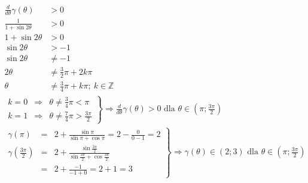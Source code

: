         \begin{align*}
        	\frac{d}{d\theta}\gamma\left( \theta\right)& > 0& \hspace{10cm}\\
        	\frac{
        		1
        	}{
        		1 + \sin 2\theta
        	} & > 0\\
        	1 + \sin 2\theta & > 0\\
        	 \sin 2\theta & > -1\\
        	 \sin 2\theta & \neq -1\\
        	 2\theta & \neq \frac{3}{2}\pi + 2k\pi\\
        	 \theta & \neq \frac{3}{4}\pi + k\pi ; \ k \in \mathbb{Z}
        \end{align*}
       	\begin{align*}
       		\left. \begin{array}{rcl}
       		 k = 0 & \Rightarrow & \theta \neq \frac{3}{4}\pi < \pi  \\
    	 	 k = 1 & \Rightarrow &\theta \neq \frac{7}{4}\pi > \frac{3\pi}{2}
    	 	\end{array}    \right\}\Rightarrow \frac{d}{d\theta}\gamma\left( \theta\right) > 0 \text{ dla } \theta \in \left( \pi;\frac{3\pi}{2}\right)& \hspace{10cm}
        \end{align*}
       	\begin{align*}
       	\left. \begin{array}{rcl}
       		\gamma\left( \pi\right) & = &
       		 2 + \frac{\sin \pi}{\sin \pi + \cos \pi } 
       		 =2 - \frac{0}{0 - 1} = 2\\	
       		\gamma\left( \frac{3\pi}{2}\right) & = &
       		2 + \frac{\sin  \frac{3\pi}{2}}{\sin  \frac{3\pi}{2} + \cos \frac{3\pi}{2}}\\
       		& = & 2 + \frac{-1}{-1 + 0}= 2 + 1 = 3
       	\end{array} \right\} \Rightarrow \gamma\left( \theta\right) \in \left( 2;3\right) \text{ dla } \theta \in \left( \pi;\frac{3\pi}{2}\right)& \hspace{10cm}
        \end{align*}